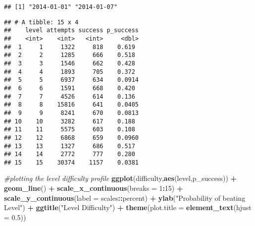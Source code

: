 \documentclass[
]{article}
\newenvironment{Shaded}{\begin{snugshade}}{\end{snugshade}}
\newcommand{\CommentTok}[1]{\textcolor[rgb]{0.56,0.35,0.01}{\textit{#1}}}
\newcommand{\DataTypeTok}[1]{\textcolor[rgb]{0.13,0.29,0.53}{#1}}
\newcommand{\DecValTok}[1]{\textcolor[rgb]{0.00,0.00,0.81}{#1}}
\newcommand{\FloatTok}[1]{\textcolor[rgb]{0.00,0.00,0.81}{#1}}
\newcommand{\KeywordTok}[1]{\textcolor[rgb]{0.13,0.29,0.53}{\textbf{#1}}}
\newcommand{\NormalTok}[1]{#1}
\newcommand{\OperatorTok}[1]{\textcolor[rgb]{0.81,0.36,0.00}{\textbf{#1}}}
\newcommand{\StringTok}[1]{\textcolor[rgb]{0.31,0.60,0.02}{#1}}
\begin{document}
\begin{verbatim}
## [1] "2014-01-01" "2014-01-07"
\end{verbatim}

\begin{Shaded}
\end{Shaded}

\begin{verbatim}
## # A tibble: 15 x 4
##    level attempts success p_success
##    <int>    <int>   <int>     <dbl>
##  1     1     1322     818    0.619 
##  2     2     1285     666    0.518 
##  3     3     1546     662    0.428 
##  4     4     1893     705    0.372 
##  5     5     6937     634    0.0914
##  6     6     1591     668    0.420 
##  7     7     4526     614    0.136 
##  8     8    15816     641    0.0405
##  9     9     8241     670    0.0813
## 10    10     3282     617    0.188 
## 11    11     5575     603    0.108 
## 12    12     6868     659    0.0960
## 13    13     1327     686    0.517 
## 14    14     2772     777    0.280 
## 15    15    30374    1157    0.0381
\end{verbatim}

\begin{Shaded}
\begin{Highlighting}[]
\CommentTok{#plotting the level difficulty profile}
\KeywordTok{ggplot}\NormalTok{(difficulty,}\KeywordTok{aes}\NormalTok{(level,p_success)) }\OperatorTok{+}
\StringTok{  }\KeywordTok{geom_line}\NormalTok{() }\OperatorTok{+}\StringTok{ }\KeywordTok{scale_x_continuous}\NormalTok{(}\DataTypeTok{breaks =} \DecValTok{1}\OperatorTok{:}\DecValTok{15}\NormalTok{) }\OperatorTok{+}
\StringTok{  }\KeywordTok{scale_y_continuous}\NormalTok{(}\DataTypeTok{label =}\NormalTok{ scales}\OperatorTok{::}\NormalTok{percent) }\OperatorTok{+}
\StringTok{  }\KeywordTok{ylab}\NormalTok{(}\StringTok{"Probability of beating Level"}\NormalTok{) }\OperatorTok{+}
\StringTok{  }\KeywordTok{ggtitle}\NormalTok{(}\StringTok{"Level Difficulty"}\NormalTok{) }\OperatorTok{+}
\StringTok{  }\KeywordTok{theme}\NormalTok{(}\DataTypeTok{plot.title =} \KeywordTok{element_text}\NormalTok{(}\DataTypeTok{hjust =} \FloatTok{0.5}\NormalTok{))}
\end{Highlighting}
\end{Shaded}
\end{document}
